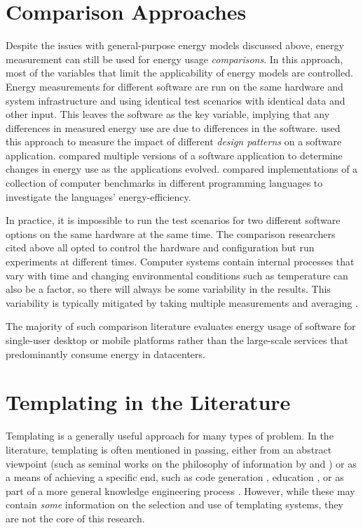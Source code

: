 \section{Comparison Approaches}
\label{literature:related methods}

Despite the issues with general-purpose energy models discussed above, energy measurement can still be used for energy usage \emph{comparisons}. In this approach, most of the variables that limit the applicability of energy models are controlled. Energy measurements for different software are run on the same hardware and system infrastructure and using identical test scenarios with identical data and other input. This leaves the software as the key variable, implying that any differences in measured energy use are due to differences in the software. \citet{Bunse2013} used this approach to measure the impact of different \emph{design patterns} \citep{Fowler1999} on a software application. \citet{Zhang2014a} compared multiple versions of a software application to determine changes in energy use as the applications evolved. \citet{Pereira2021} compared implementations of a collection of computer benchmarks in different \gls{programming language}s to investigate the languages' energy-efficiency. 

In practice, it is impossible to run the test scenarios for two different software options on the same hardware at the same time. The comparison researchers cited above all opted to control the hardware and configuration but run experiments at different times. Computer systems contain internal processes that vary with time and changing environmental conditions such as temperature can also be a factor, so there will always be some variability in the results. This variability is typically mitigated by taking multiple measurements and averaging \citep{Zhang2014a} \citep{Pereira2021}.

The majority of such comparison literature evaluates energy usage of software for single-user desktop or mobile platforms rather than the large-scale services that predominantly consume energy in datacenters.



\section{Templating in the Literature}
\label{literature:templating}

Templating is a generally useful approach for many types of problem. In the literature, templating is often mentioned in passing, either from an abstract viewpoint (such as seminal works on the philosophy of information by \citet{Bush1945} and \citet{Nelson1974}) or as a means of achieving a specific end, such as code generation \citep{Drescher2024}, education \citep{Goetz2023}, or as part of a more general knowledge engineering process \citep{Caldwell1998}. However, while these may contain \emph{some} information on the selection and use of templating systems, they are not the core of this research.

